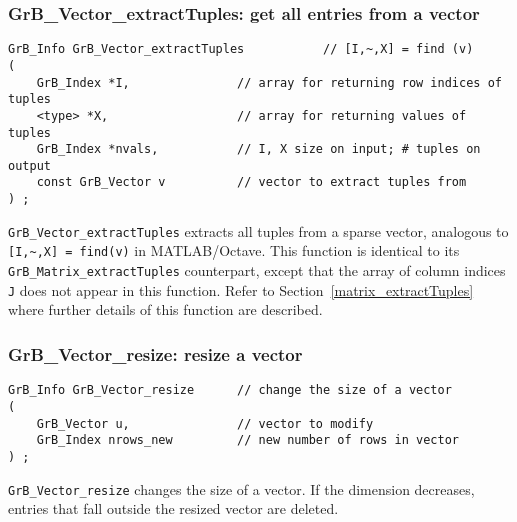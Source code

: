 \documentclass[12pt]{article}
\begin{document}
\subsubsection{{\sf GrB\_Vector\_extractTuples:} get all entries from a vector}
\label{vector_extractTuples}

\begin{mdframed}[userdefinedwidth=6in]
{\footnotesize
\begin{verbatim}
GrB_Info GrB_Vector_extractTuples           // [I,~,X] = find (v)
(
    GrB_Index *I,               // array for returning row indices of tuples
    <type> *X,                  // array for returning values of tuples
    GrB_Index *nvals,           // I, X size on input; # tuples on output
    const GrB_Vector v          // vector to extract tuples from
) ;
\end{verbatim} } \end{mdframed}

\verb'GrB_Vector_extractTuples' extracts all tuples from a sparse vector,
analogous to \verb'[I,~,X] = find(v)' in MATLAB/Octave.  This function is
identical to its \verb'GrB_Matrix_extractTuples' counterpart, except that the
array of column indices \verb'J' does not appear in this function.  Refer to
Section~\ref{matrix_extractTuples} where further details of this function are
described.

\newpage
\subsubsection{{\sf GrB\_Vector\_resize:}          resize a vector}
\label{vector_resize}

\begin{mdframed}[userdefinedwidth=6in]
{\footnotesize
\begin{verbatim}
GrB_Info GrB_Vector_resize      // change the size of a vector
(
    GrB_Vector u,               // vector to modify
    GrB_Index nrows_new         // new number of rows in vector
) ;
\end{verbatim} } \end{mdframed}

\verb'GrB_Vector_resize' changes the size of a vector.  If the dimension
decreases, entries that fall outside the resized vector are deleted.
\end{document}
